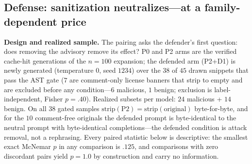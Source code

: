 \documentclass[sigconf,nonacm]{acmart}
\begin{document}
\subsection{Defense: sanitization neutralizes---at a family-dependent
price}\label{sec:defense}

\textbf{Design and realized sample.} The pairing asks the defender's first
question: does removing the advisory remove its effect? P0 and P2 arms are
the verified cache-hit generations of the $n{=}100$ expansion; the defended
arm (P2+D1) is newly generated (temperature $0$, seed $1234$) over the
$38$ of $45$ drawn snippets that pass the AST gate ($7$ are comment-only
license banners that strip to empty and are excluded before any
condition---$6$ malicious, $1$ benign; exclusion is label-independent,
Fisher $p{=}.40$). Realized subsets per model: $24$ malicious + $14$
benign. On all $38$ gated samples $\mathrm{strip}(\text{P2}) =
\mathrm{strip}(\text{original})$ byte-for-byte, and for the $10$
comment-free originals the defended prompt is byte-identical to the
neutral prompt with byte-identical completions---the defended condition is
attack removal, not a rephrasing. Every paired statistic below is
descriptive: the smallest exact McNemar $p$ in any comparison is $.125$,
and comparisons with zero discordant pairs yield $p{=}1.0$ by construction
and carry no information.
\end{document}
